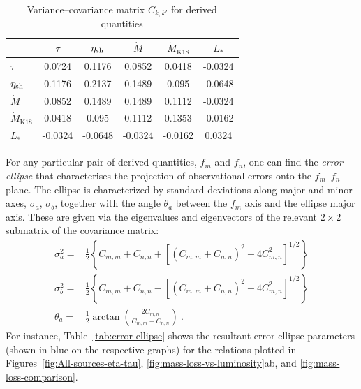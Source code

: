 \begin{table}
  \centering
  \caption[Covariance]{Variance--covariance matrix \(C_{k,k'}\) for derived quantities}
  \label{tab:covariance}
  \setlength\tabcolsep{3pt}
  \begin{tabular}{l S S S S S }
    \toprule
    & {\(\tau\)} & {\(\eta_{\text{sh}}\)}
    & {\(\dot M\)} & {\(\dot M_{\text{K18}}\)} & {\(L_*\)}
    \\
    \midrule
    \(\tau\)               &  0.0724 &  0.1176 &  0.0852 &  0.0418 & -0.0324 \\
    \(\eta_{\text{sh}}\)         &  0.1176 &  0.2137 &  0.1489 &   0.095 & -0.0648 \\
    \(\dot M\)             &  0.0852 &  0.1489 &  0.1489 &  0.1112 & -0.0324 \\
    \(\dot M_{\text{K18}}\)&  0.0418 &   0.095 &  0.1112 &  0.1353 & -0.0162 \\
    \(L_*\)                & -0.0324 & -0.0648 & -0.0324 & -0.0162 &  0.0324 \\
    \bottomrule
  \end{tabular}
\end{table}

For any particular pair of derived quantities, \(f_m\) and \(f_{n}\),
one can find the \textit{error ellipse} that characterises the
projection of observational errors onto the \(f_m\)--\(f_{n}\) plane.
The ellipse is characterized by standard deviations along major and
minor axes, \(\sigma_a\), \(\sigma_b\), together with the angle
\(\theta_a\) between the \(f_m\) axis and the ellipse major axis.
These are given via the eigenvalues and eigenvectors of the relevant
\(2 \times 2\) submatrix of the covariance matrix:
\begin{align}
  \label{eq:error-ellipse}
  \sigma_a^2 = & \frac12 \left\{   C_{m,m} + C_{n,n}
                 + \left[ \left( C_{m,m} + C_{n,n} \right)^2
                 - 4 C_{m,n}^2 \right]^{1/2}\right\} \\
  \sigma_b^2 = & \frac12 \left\{   C_{m,m} + C_{n,n}
                 - \left[ \left( C_{m,m} + C_{n,n} \right)^2
                 - 4 C_{m,n}^2 \right]^{1/2}\right\} \\
  \theta_a = & \frac12 \arctan \left( \frac{2 C_{m,n}}{C_{m,m} - C_{n,n}} \right) \ .
\end{align}
For instance, Table~\ref{tab:error-ellipse} shows the resultant error
ellipse parameters (shown in blue on the respective graphs) for the
relations plotted in Figures~\ref{fig:All-sources-eta-tau},
\ref{fig:mass-loss-vs-luminosity}ab, and
\ref{fig:mass-loss-comparison}.

